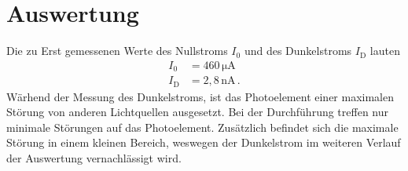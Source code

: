 


\nocite{anleitungV407}
\section{Auswertung}
\label{sec:Auswertung}
Die zu Erst gemessenen Werte des Nullstroms $I_0$ und des Dunkelstroms $I_{\text{D}}$ lauten
\begin{align*}
  I_0 &= 460\,\unit{\micro\ampere}\\
  I_{\text{D}} &= 2,8\,\unit{\nano\ampere}\,.
\end{align*}
Wärhend der Messung des Dunkelstroms, ist das Photoelement einer maximalen Störung von anderen Lichtquellen ausgesetzt. Bei der Durchführung treffen nur minimale Störungen auf
das Photoelement. Zusätzlich befindet sich die maximale Störung in einem kleinen Bereich, weswegen der Dunkelstrom im weiteren Verlauf der Auswertung vernachlässigt wird.

